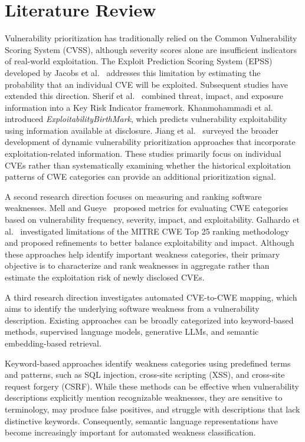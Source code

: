 \documentclass[conference,compsoc]{IEEEtran}
\begin{document}
\section{Literature Review}

Vulnerability prioritization has traditionally relied on
the Common Vulnerability Scoring System (CVSS), although
severity scores alone are insufficient indicators of
real-world exploitation. The Exploit Prediction Scoring
System (EPSS) developed by Jacobs et
al.~\cite{jacobs2023epss} addresses this limitation by
estimating the probability that an individual CVE will
be exploited. Subsequent studies have extended this
direction. Sherif et al.~\cite{sherif2026kri} combined
threat, impact, and exposure information into a Key
Risk Indicator framework. Khanmohammadi et
al.~\cite{khanmohammadi2025exploitabilitybirthmark}
introduced \textit{ExploitabilityBirthMark}, which
predicts vulnerability exploitability using information
available at disclosure. Jiang et
al.~\cite{jiang2025survey} surveyed the broader
development of dynamic vulnerability prioritization
approaches that incorporate exploitation-related
information. These studies primarily focus on
individual CVEs rather than systematically examining
whether the historical exploitation patterns of CWE
categories can provide an additional prioritization
signal.

A second research direction focuses on measuring and
ranking software weaknesses. Mell and
Gueye~\cite{mell2020suite} proposed metrics for
evaluating CWE categories based on vulnerability
frequency, severity, impact, and exploitability.
Galhardo et
al.~\cite{galhardo2020measurements}
investigated limitations of the MITRE CWE Top 25 \cite{cwe_top25} ranking methodology and proposed refinements to
better balance exploitability and impact. Although
these approaches help identify important weakness
categories, their primary objective is to characterize
and rank weaknesses in aggregate rather than estimate
the exploitation risk of newly disclosed CVEs.

A third research direction investigates automated
CVE-to-CWE mapping, which aims to identify the
underlying software weakness from a vulnerability
description. Existing approaches can be broadly
categorized into keyword-based methods, supervised
language models, generative LLMs, and semantic
embedding-based retrieval.

Keyword-based approaches identify weakness categories
using predefined terms and patterns, such as SQL
injection, cross-site scripting (XSS), and
cross-site request forgery (CSRF). While these
methods can be effective when vulnerability
descriptions explicitly mention recognizable
weaknesses, they are sensitive to terminology,
may produce false positives, and struggle with
descriptions that lack distinctive keywords.
Consequently, semantic language representations
have become increasingly important for automated
weakness classification.
\end{document}
